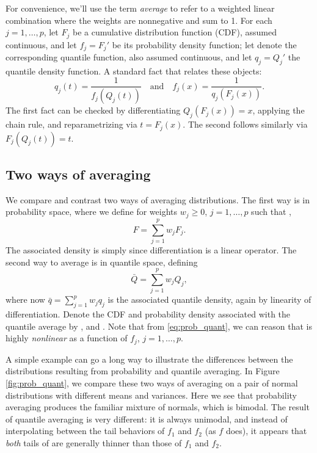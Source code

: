\documentclass{article}
\begin{document}
For convenience, we'll use the term \emph{average} to refer to a weighted linear
combination where the weights are nonnegative and sum to 1. For each
$j=1,\dots,p$, let $F_j$ be a cumulative distribution function (CDF), assumed
continuous, and let $f_j=F_j'$ be its probability density function; let
 denote the corresponding quantile function, also
assumed continuous, and let $q_j=Q_j'$ the quantile density function. A standard
fact that relates these 
objects:    
\begin{equation}
\label{eq:prob_quant}
q_j(t) = \frac{1}{f_j(Q_j(t))} \quad \text{and} \quad 
f_j(x) = \frac{1}{q_j(F_j(x))}.  
\end{equation}
The first fact can be checked by differentiating $Q_j(F_j(x)) = x$, applying the
chain rule, and reparametrizing via $t=F_j(x)$. The second follows similarly via
$F_j(Q_j(t)) = t$.

\subsection{Two ways of averaging}

We compare and contrast two ways of averaging distributions. The first way is in
probability space, where we define for weights $w_j \geq 0$, $j=1,\dots,p$ such
that , 
\[
F = \sum_{j=1}^p w_j F_j.
\]
The associated density is simply  since
differentiation is a linear operator. The second way to average is in quantile
space, defining 
\[ 
\bar{Q} = \sum_{j=1}^p w_j Q_j,
\]
where now $\bar{q} = \sum_{j=1}^p w_j q_j$ is the associated quantile density,
again by linearity of differentiation. Denote the CDF and probability density
associated with the quantile average by , and
. Note that from \eqref{eq:prob_quant}, we can
reason that  is highly \emph{nonlinear} as a function of $f_j$, 
$j=1,\dots,p$.

A simple example can go a long way to illustrate the differences between the
distributions resulting from probability and quantile averaging. In Figure
\ref{fig:prob_quant}, we compare these two ways of averaging on a pair of
normal distributions with different means and variances.  Here we see that
probability averaging produces the familiar mixture of normals, which is
bimodal. The result of quantile averaging is very different: it is always
unimodal, and instead of interpolating between the tail behaviors of $f_1$ and
$f_2$ (as $f$ does), it appears that \emph{both} tails of  are 
generally thinner than those of $f_1$ and $f_2$.
\end{document}
